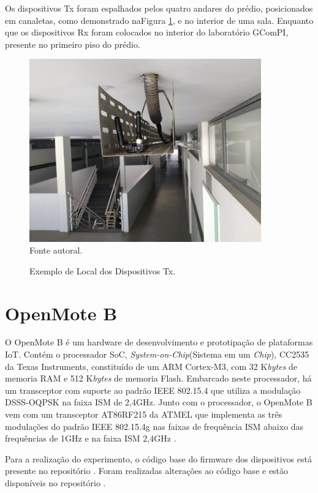 Os dispositivos Tx foram espalhados pelos quatro andares do prédio, posicionados em canaletas, como demonstrado naFigura \ref{fig:tx_canaleta}, e no interior de uma sala. Enquanto que os dispositivos Rx foram colocados no interior do laboratório GComPI, presente no primeiro piso do prédio.

\begin{figure}[h]
      \begin{center}
            \caption{Exemplo de Local dos Dispositivos Tx.}
            \includegraphics[width=10cm]{./sections/textual/chapters/images/tx_canaleta.jpg}\\
            Fonte autoral.
            \label{fig:tx_canaleta}
      \end{center}
\end{figure}

\section{OpenMote B}
O OpenMote B é um hardware de desenvolvimento e prototipação de plataformas IoT. Contém o processador SoC, \emph{System-on-Chip}(Sistema em um \emph{Chip}), CC2535 da Texas Instruments, constituído de um ARM Cortex-M3, com 32 K\emph{bytes} de memoria RAM e 512 K\emph{bytes} de memoria Flash. Embarcado neste processador, há um transceptor com suporte ao padrão IEEE 802.15.4 que utiliza a modulação DSSS-OQPSK na faixa ISM de 2,4GHz. Junto com o processador, o OpenMote B vem com um transceptor AT86RF215 da ATMEL que implementa as três modulações do padrão IEEE 802.15.4g nas faixas de frequência ISM abaixo das frequências de 1GHz e na faixa ISM 2,4GHz \cite{openmoteb-userguide}.

Para a realização do experimento, o código base do firmware dos dispositivos está presente no repositório \cite{openmoteb-firmware}. Foram realizadas alterações ao código base e estão disponíveis no repositório \cite{openmoteb-gcompi}.

